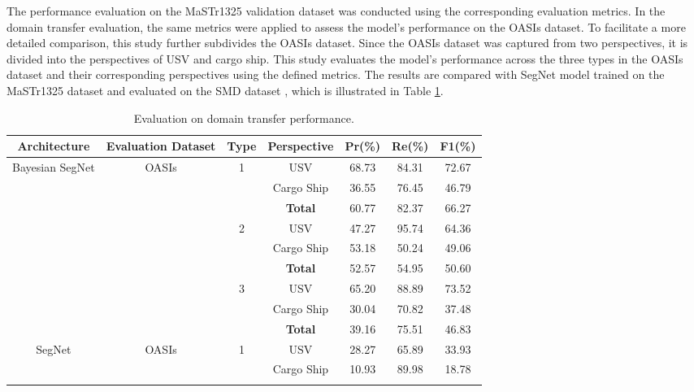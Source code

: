 The performance evaluation on the MaSTr1325 validation dataset was conducted using the corresponding evaluation 
metrics. In the domain transfer evaluation, the same metrics were applied to assess the model's performance on the 
OASIs dataset. To facilitate a more detailed comparison, this study further subdivides the OASIs dataset. Since 
the OASIs dataset was captured from two perspectives, it is divided into the perspectives of USV and cargo ship. 
This study evaluates the model's performance across the three types in the OASIs dataset and their corresponding 
perspectives using the defined metrics. The results are compared with SegNet model trained on the MaSTr1325 dataset 
and evaluated on the SMD dataset \cite{WaSR}, which is illustrated in Table \ref{tab:DTEP}. 
\begin{table}[ht!]
    \centering
    \caption{Evaluation on domain transfer performance.}
    \label{tab:DTEP}
    \begin{tabular}{c|c|c|c|c|c|c}
    \textbf{Architecture} & \textbf{Evaluation Dataset} & \textbf{Type} & \textbf{Perspective} & \textbf{Pr}(\%) & \textbf{Re}(\%) & \textbf{F1}(\%) \\ \hline
    \multirow{9}{*}{Bayesian SegNet} & \multirow{9}{*}{OASIs} & \multirow{3}{*}{1} & USV & 68.73 & 84.31 & 72.67 \\  \cline{4-7}
     & &                    & Cargo Ship & 36.55 & 76.45 & 46.79 \\ \cline{4-7}
     & &                    & \textbf{Total} & 60.77 & 82.37 & 66.27 \\ \cline{3-7}
     & & \multirow{3}{*}{2} & USV & 47.27 & 95.74 & 64.36 \\ \cline{4-7}
     & &                    & Cargo Ship & 53.18 & 50.24 & 49.06 \\ \cline{4-7}
     & &                    & \textbf{Total} & 52.57 & 54.95 & 50.60 \\ \cline{3-7}
     & & \multirow{3}{*}{3} & USV & 65.20 & 88.89 & 73.52 \\ \cline{4-7}
     & &                    & Cargo Ship & 30.04 & 70.82 & 37.48 \\ \cline{4-7}
     & &                    & \textbf{Total} & 39.16 & 75.51 & 46.83 \\ \hline
     \multirow{9}{*}{SegNet} & \multirow{9}{*}{OASIs} & \multirow{3}{*}{1} & USV & 28.27 & 65.89 & 33.93 \\  \cline{4-7}
     & &                    & Cargo Ship & 10.93 & 89.98 & 18.78 \\ \cline{4-7}

\end{tabular}
\end{table}
